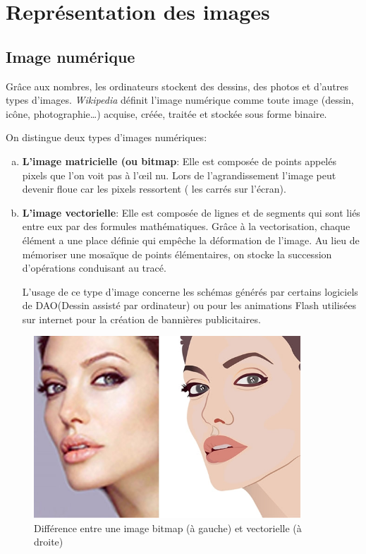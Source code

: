 \documentclass[11pt, a4paper]{book}
\begin{document}
\section{Représentation des images}

\subsection{Image numérique}

Grâce aux nombres, les ordinateurs stockent des dessins, des photos et d’autres types d’images.
{\it Wikipedia} définit l'image numérique  comme toute image (dessin, icône, photographie…) acquise, créée, traitée et stockée sous forme binaire.

On distingue deux types d’images numériques:
\begin{enumerate}[a)]
\item {\bf L'image matricielle (ou bitmap}:
Elle est composée de points appelés pixels que l’on voit pas à l'œil nu. Lors de l’agrandissement l’image peut devenir floue car les pixels ressortent ( les carrés sur l’écran).
\item {\bf L'image vectorielle}:
Elle est composée de lignes et de segments qui sont liés entre eux par des formules mathématiques. Grâce à la vectorisation, chaque élément a une place définie qui empêche la déformation de l’image. Au lieu de mémoriser une mosaïque de points élémentaires, on stocke la succession d’opérations conduisant au tracé.

L’usage de ce type d’image concerne les schémas générés par certains logiciels de DAO(Dessin assisté par ordinateur) ou pour les animations Flash utilisées sur internet pour la création de bannières publicitaires.

\end{enumerate}

\begin{center}
\begin{figure}
\centering
\includegraphics[width=10cm]{images/bitmapvectoriel}
\caption{Différence entre une image bitmap (à gauche) et vectorielle (à droite)}
\end{figure}
\end{center}
\end{document}
